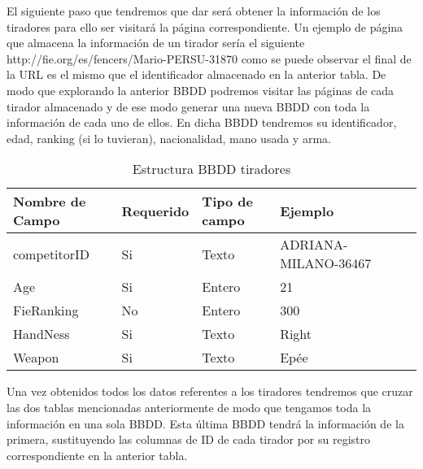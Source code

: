 El siguiente paso que tendremos que dar será obtener la información de los tiradores
 para ello ser visitará la página correspondiente. Un ejemplo de página que almacena
 la información de un tirador sería el siguiente http://fie.org/es/fencers/Mario-PERSU-31870
 como se puede observar el final de la URL es el mismo que el identificador almacenado en la
 anterior tabla. De modo que explorando la anterior BBDD podremos visitar las páginas de cada
 tirador almacenado y de ese modo generar una nueva BBDD con toda la información de cada uno de ellos.
 En dicha BBDD tendremos su identificador, edad, ranking (si lo tuvieran), nacionalidad, mano usada
 y arma.

\begin{table}[htb]%
  \centering
  \caption{Estructura BBDD tiradores}
  \label{tab:anchura}
  \begin{tabular}{ | l | l | l | l | l | l | }
    \hline
    Nombre de Campo & Requerido & Tipo de campo & Ejemplo \\ \hline
    competitorID & Si & Texto & ADRIANA-MILANO-36467 \\ \hline
    Age & Si & Entero & 21 \\ \hline
    FieRanking & No & Entero & 300 \\ \hline
    HandNess & Si & Texto & Right \\ \hline
    Weapon & Si & Texto & Epée \\
    \hline
  \end{tabular}
\end{table}

Una vez obtenidos todos los datos referentes a los tiradores tendremos que cruzar
 las dos tablas mencionadas anteriormente de modo que tengamos toda la información
 en una sola BBDD. Esta última BBDD tendrá la información de la primera, sustituyendo
 las columnas de ID de cada tirador por su registro correspondiente en la anterior tabla.

